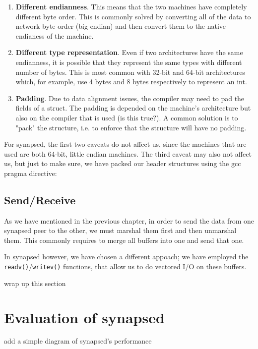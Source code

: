 \begin{enumerate}
	\item \textbf{Different endianness}. This means that the two machines have 
		completely different byte order. This is commonly solved by converting 
		all of the data to network byte order (big endian) and then convert 
		them to the native endianess of the machine.
	\item \textbf{Different type representation}. Even if two architectures 
		have the same endianness, it is possible that they represent the same 
		types with different number of bytes. This is most common with 32-bit 
		and 64-bit architectures which, for example, use 4 bytes and 8 bytes 
		respectively to represent an int.
	\item \textbf{Padding}. Due to data alignment issues, the compiler may need 
		to pad the fields of a struct. The padding is depended on the machine's 
		architecture but also on the compiler that is used (\fixme is this 
		true?).  A common solution is to "pack" the structure, i.e. to enforce 
		that the structure will have no padding.
\end{enumerate}

For synapsed, the first two caveats do not affect us, since the machines that 
are used are both 64-bit, little endian machines. The third caveat may also not 
affect us, but just to make sure, we have packed our header structures using 
the gcc pragma directive:


\subsection{Send/Receive}

As we have mentioned in the previous chapter, in order to send the data from 
one synapsed peer to the other, we must marshal them first and then unmarshal 
them. This commonly requires to merge all buffers into one and send that one.  

In synapsed however, we have chosen a different appoach; we have employed the 
\texttt{readv()}/\texttt{writev()} functions, that allow us to do vectored I/O 
on these buffers.

\todo wrap up this section

\section{Evaluation of synapsed}


\todo add a simple diagram of synapsed's performance
